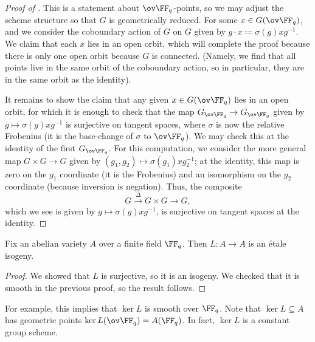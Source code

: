 \documentclass[../notes.tex]{subfiles}
\begin{document}
\begin{proof}[Proof of ]
	This is a statement about $\ov\FF_q$-points, so we may adjust the scheme structure so that $G$ is geometrically reduced. For some $x\in G(\ov\FF_q)$, and we consider the coboundary action of $G$ on $G$ given by $g\cdot x\coloneqq \sigma(g)xg^{-1}$. We claim that each $x$ lies in an open orbit, which will complete the proof because there is only one open orbit because $G$ is connected. (Namely, we find that all points live in the same orbit of the coboundary action, so in particular, they are in the same orbit as the identity).

	It remains to show the claim that any given $x\in G(\ov\FF_q)$ lies in an open orbit, for which it is enough to check that the map $G_{\ov\FF_q}\to G_{\ov\FF_q}$ given by $g\mapsto\sigma(g)xg^{-1}$ is surjective on tangent spaces, where $\sigma$ is now the relative Frobenius (it is the base-change of $\sigma$ to $\ov\FF_q$). We may check this at the identity of the first $G_{\ov\FF_q}$. For this computation, we consider the more general map $G\times G\to G$ given by $(g_1,g_2)\mapsto\sigma(g_1)xg_2^{-1}$; at the identity, this map is zero on the $g_1$ coordinate (it is the Frobenius) and an isomorphism on the $g_2$ coordinate (because inversion is negation). Thus, the composite
	\[G\stackrel\Delta\to G\times G\to G,\]
	which we see is given by $g\mapsto\sigma(g)xg^{-1}$, is surjective on tangent spaces at the identity.
\end{proof}
\begin{corollary}
	Fix an abelian variety $A$ over a finite field $\FF_q$. Then $L\colon A\to A$ is an \'etale isogeny.
\end{corollary}
\begin{proof}
	We showed that $L$ is surjective, so it is an isogeny. We checked that it is smooth in the previous proof, so the result follows.
\end{proof}
\begin{remark}
	For example, this implies that $\ker L$ is smooth over $\FF_q$. Note that $\ker L\subseteq A$ has geometric points $\ker L(\ov\FF_q)=A(\FF_q)$. In fact, $\ker L$ is a constant group scheme.
\end{remark}
\end{document}
